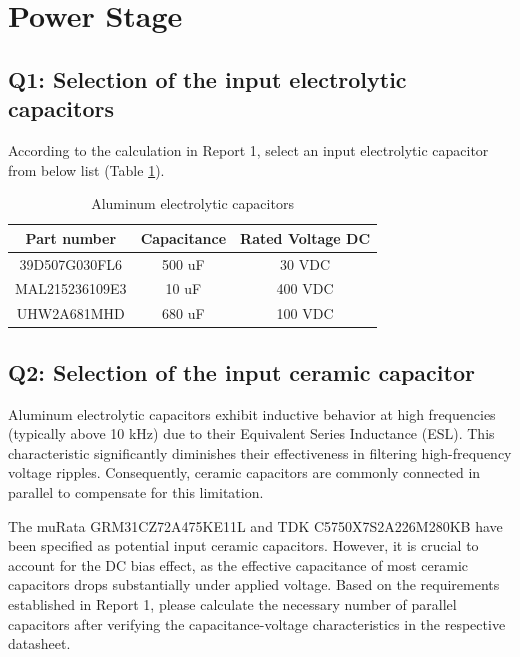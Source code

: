 \documentclass{PELsmallreport}
\begin{document}

\section{Power Stage}
\subsection{Q1: Selection of the input electrolytic capacitors }
According to the calculation in Report 1, select an input electrolytic capacitor from below list (Table \ref{tab:inputcap}).
\begin{table}[!h]
\centering
\caption{Aluminum electrolytic capacitors }
\label{tab:inputcap}
\begin{tabular}{ccc}
	\toprule
	\textbf{Part number} & \textbf{Capacitance}     & \textbf{Rated Voltage DC}   \\
    \toprule
    39D507G030FL6 & 500 uF & 30 VDC \\
    MAL215236109E3 & 10 uF & 400 VDC \\
    UHW2A681MHD & 680 uF & 100 VDC\\
	\toprule
	\bottomrule
\end{tabular}
\end{table}

 \quad  {}\quad  {}\hfill{}

\subsection{Q2: Selection of the input ceramic capacitor}
Aluminum electrolytic capacitors exhibit inductive behavior at high frequencies (typically above 10 kHz) due to their Equivalent Series Inductance (ESL). This characteristic significantly diminishes their effectiveness in filtering high-frequency voltage ripples. Consequently, ceramic capacitors are commonly connected in parallel to compensate for this limitation.

The muRata GRM31CZ72A475KE11L and TDK C5750X7S2A226M280KB have been specified as potential input ceramic capacitors. However, it is crucial to account for the DC bias effect, as the effective capacitance of most ceramic capacitors drops substantially under applied voltage. Based on the requirements established in Report 1, please calculate the necessary number of parallel capacitors after verifying the capacitance-voltage characteristics in the respective datasheet.
\end{document}
